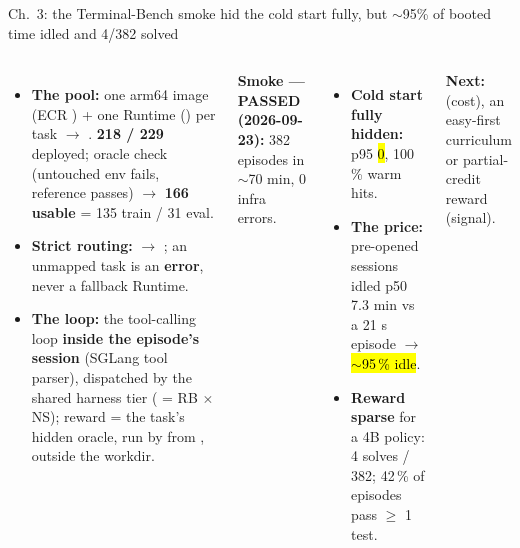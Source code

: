 \begin{frame}{Ch.\ 3: the Terminal-Bench smoke hid the cold start fully, but $\sim$95\% of booted time idled and 4/382 solved}
\begin{columns}[T]
\begin{itemize}\scriptsize\setlength{\itemsep}{1.2mm}
\item \textbf{The pool:} one arm64 image (ECR ) + one Runtime () per task $\rightarrow$ . \textbf{218 / 229} deployed; oracle check (untouched env fails, reference passes) $\rightarrow$ \textbf{166 usable} = 135 train / 31 eval.
\item \textbf{Strict routing:}  $\rightarrow$ ; an unmapped task is an \textbf{error}, never a fallback Runtime.
\item \textbf{The loop:} the tool-calling  loop \textbf{inside the episode's session} (SGLang  tool parser), dispatched by the shared harness tier ( = RB $\times$ NS); reward = the task's hidden oracle, run by  from , outside the workdir.
\end{itemize}
{\footnotesize\textbf{Smoke --- PASSED (2026-09-23):} 382 episodes in $\sim$70 min, 0 infra errors.\par}
\begin{itemize}\scriptsize\setlength{\itemsep}{1.2mm}
\item \textbf{Cold start fully hidden:}  p95 \hl{0}, 100\,\% warm hits.
\item \textbf{The price:} pre-opened sessions idled p50 7.3 min vs a 21 s episode $\rightarrow$ \hl{$\sim$95\,\% idle}.
\item \textbf{Reward sparse} for a 4B policy: 4 solves / 382; 42\,\% of episodes pass $\ge$ 1 test.
\end{itemize}
\vspace{2mm}
\colorbox{panel}{\parbox{\dimexpr\linewidth-2\fboxsep}{\scriptsize\textbf{Next:}  (cost), an easy-first curriculum or partial-credit reward (signal).}}
\end{columns}
\end{frame}

